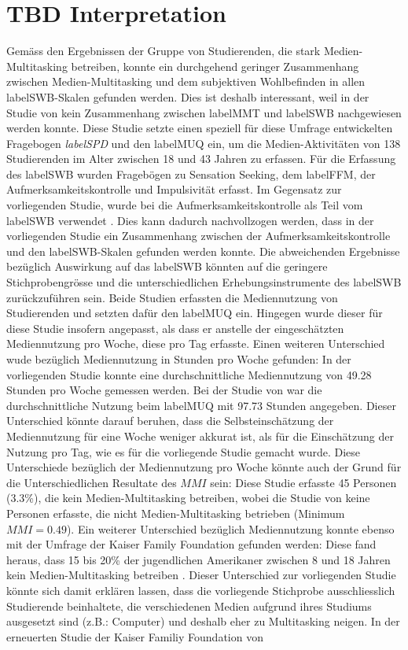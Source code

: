\section{TBD Interpretation}\label{section.diskussion.interpretation}
Gemäss den Ergebnissen der Gruppe von Studierenden, die stark Medien-Multitasking betreiben, konnte ein durchgehend geringer Zusammenhang zwischen Medien-Multitasking und dem subjektiven Wohlbefinden in allen \gls{labelSWB}-Skalen gefunden werden. Dies ist deshalb interessant, weil in der Studie von  kein Zusammenhang zwischen \gls{labelMMT} und \gls{labelSWB} nachgewiesen werden konnte. Diese Studie setzte einen speziell für diese Umfrage entwickelten Fragebogen \textit{\gls{labelSPD}} und den \gls{labelMUQ} ein, um die Medien-Aktivitäten von 138 Studierenden im Alter zwischen 18 und 43 Jahren zu erfassen. Für die Erfassung des \gls{labelSWB} wurden Fragebögen zu Sensation Seeking, dem \gls{labelFFM}, der Aufmerksamkeitskontrolle und Impulsivität erfasst. Im Gegensatz zur vorliegenden Studie, wurde bei  die Aufmerksamkeitskontrolle als Teil vom \gls{labelSWB} verwendet \cite{Fergus2012}. Dies kann dadurch nachvollzogen werden, dass in der vorliegenden Studie ein Zusammenhang zwischen der Aufmerksamkeitskontrolle und den \gls{labelSWB}-Skalen gefunden werden konnte. Die abweichenden Ergebnisse bezüglich Auswirkung auf das \gls{labelSWB} könnten auf die geringere Stichprobengrösse und die unterschiedlichen Erhebungsinstrumente des \gls{labelSWB} zurückzuführen sein. Beide Studien erfassten die Mediennutzung von Studierenden und setzten dafür den \gls{labelMUQ} ein. Hingegen wurde dieser für diese Studie insofern angepasst, als dass er anstelle der eingeschätzten Mediennutzung pro Woche, diese pro Tag erfasste. Einen weiteren Unterschied wude bezüglich Mediennutzung in Stunden pro Woche gefunden: In der vorliegenden Studie konnte eine durchschnittliche Mediennutzung von 49.28 Stunden pro Woche gemessen werden. Bei der Studie von  war die durchschnittliche Nutzung beim \gls{labelMUQ} mit 97.73 Stunden angegeben. Dieser Unterschied könnte darauf beruhen, dass die Selbsteinschätzung der Mediennutzung für eine Woche weniger akkurat ist, als für die Einschätzung der Nutzung pro Tag, wie es für die vorliegende Studie gemacht wurde. Diese Unterschiede bezüglich der Mediennutzung pro Woche könnte auch der Grund für die Unterschiedlichen Resultate des $MMI$ sein: Diese Studie erfasste 45 Personen (3.3\%), die kein Medien-Multitasking betreiben, wobei die Studie von  keine Personen erfasste, die nicht Medien-Multitasking betrieben (Minimum $MMI = 0.49$). Ein weiterer Unterschied bezüglich Mediennutzung konnte ebenso mit der Umfrage der Kaiser Family Foundation gefunden werden: Diese fand heraus, dass 15 bis 20\% der jugendlichen Amerikaner zwischen 8 und 18 Jahren kein Medien-Multitasking betreiben \cite{Wallis2010}. Dieser Unterschied zur vorliegenden Studie könnte sich damit erklären lassen, dass die vorliegende Stichprobe ausschliesslich Studierende beinhaltete, die verschiedenen Medien aufgrund ihres Studiums ausgesetzt sind (z.B.: Computer) und deshalb eher zu Multitasking neigen. In der erneuerten Studie der Kaiser Familiy Foundation von 